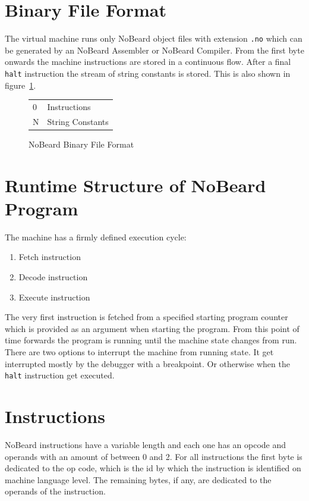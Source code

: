 \section{Binary File Format}
The virtual machine runs only NoBeard object files with extension \lstinline$.no$ which can be generated by an NoBeard Assembler or NoBeard Compiler. From the first byte onwards the machine instructions are stored in a continuous flow. After a final \lstinline$halt$ instruction the stream of string constants is stored. This is also shown in figure~\ref{fig:binaryfileformat}.

\begin{figure}[h]
\begin{center}
\begin{tabular}{p{8em}|p{8em}|}
\cline{2-2}
\parbox[t][3em][t]{8em}{\hfill 0} & Instructions \\[3em] 
\parbox[b][2em][b]{8em}{\hfill N} & String Constants \\ 
\end{tabular}
\end{center}
\caption{NoBeard Binary File Format}\label{fig:binaryfileformat}
\end{figure}

\section{Runtime Structure of NoBeard Program}
The machine has a firmly defined execution cycle:
\begin{enumerate}
\item Fetch instruction
\item Decode instruction
\item Execute instruction
\end{enumerate}
The very first instruction is fetched from a specified starting program counter which is provided as an argument when starting the program. From this point of time forwards the program is running until the machine state changes from run. There are two options to interrupt the machine from running state. It get interrupted mostly by the debugger with a breakpoint. Or otherwise when the \lstinline$halt$ instruction get executed.
\section{Instructions}\label{sec:instructions}
NoBeard instructions have a variable length and each one has an opcode and operands with an amount of between 0 and 2. For all instructions the first byte is dedicated to the op code, which is the id by which the instruction is identified on machine language level. The remaining bytes, if any, are dedicated to the operands of the instruction. 
